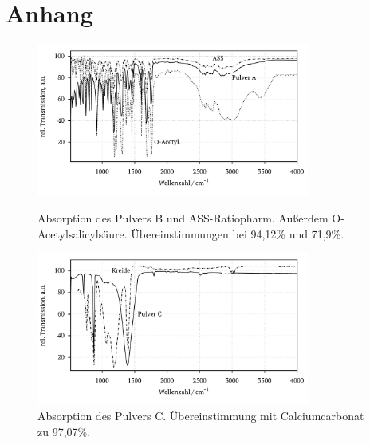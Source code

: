 \documentclass[a4paper,10pt,twocolumn]{article}
\begin{document}
	
	

	\onecolumn
	\section{Anhang}

		\begin{figure}[h]
		\centering
			\includegraphics[width=0.8\textwidth]{Gruppe2A/pulver_b.pdf}				\caption{Absorption des Pulvers B und ASS-Ratiopharm. Au{\ss}erdem O-Acetylsalicyls\"aure. \"Ubereinstimmungen bei 94,12\% und 71,9\%.}\label{img:b}
			\includegraphics[width=0.8\textwidth]{Gruppe2A/pulver_c.pdf}				\caption{Absorption des Pulvers C. \"Ubereinstimmung mit Calciumcarbonat zu 97,07\%.}\label{img:c}
		\end{figure}
\end{document}
